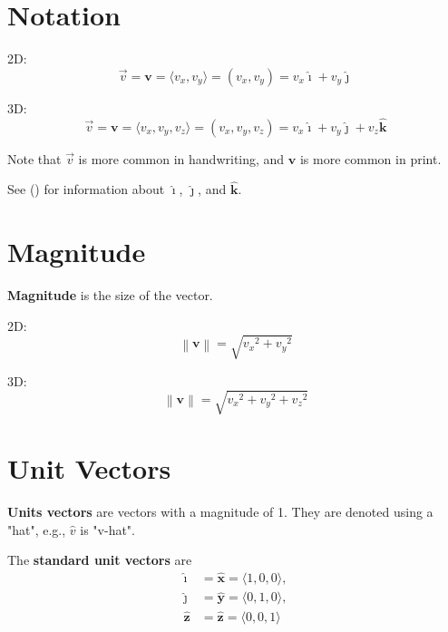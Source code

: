 \documentclass[a4paper, titlepage]{book}
\begin{document}
\section{Notation}

2D:
\begin{equation}
    \vec{v}
    = \bm{v}
    = \langle v_x, v_y \rangle
    = \left( v_x, v_y \right)
    = v_x \bm{\hat{\imath}} + v_y \bm{\hat{\jmath}}
\end{equation}

3D:
\begin{equation}
    \vec{v}
    = \bm{v}
    = \langle v_x, v_y, v_z \rangle
    = \left( v_x, v_y, v_z \right)
    = v_x \bm{\hat{\imath}} + v_y \bm{\hat{\jmath}} + v_z \bm{\hat{k}}
\end{equation}

Note that \(\vec{v}\) is more common in handwriting,
and \(\bm{v}\) is more common in print.

See  ()
for information about \(\bm{\hat{\imath}}\),
\(\bm{\hat{\jmath}}\), and \(\bm{\hat{k}}\).

\section{Magnitude}

\textbf{Magnitude} is the size of the vector.

2D:
\begin{equation}
    \left\|\bm{v}\right\| = \sqrt{{v_x}^2 + {v_y}^2}
\end{equation}

3D:
\begin{equation}
    \left\|\bm{v}\right\| = \sqrt{{v_x}^2 + {v_y}^2 + {v_z}^2}
\end{equation}

\section{Unit Vectors} \label{sec:unit-vectors}

\textbf{Units vectors} are vectors with a magnitude of 1.
They are denoted using a "hat", e.g., \(\hat{v}\) is "v-hat".

The \textbf{standard unit vectors} are
\begin{equation}
    \begin{aligned}
        \bm{\hat{\imath}} &= \bm{\hat{x}} = \langle 1, 0, 0 \rangle, \\
        \bm{\hat{\jmath}} &= \bm{\hat{y}} = \langle 0, 1, 0 \rangle, \\
        \bm{\hat{z}} &= \bm{\hat{z}} = \langle 0, 0, 1 \rangle
    \end{aligned}
\end{equation}
\end{document}
